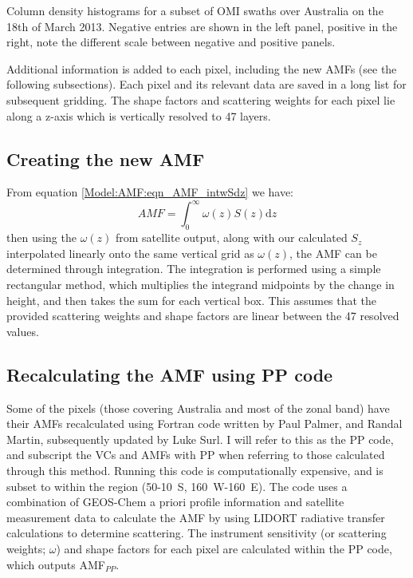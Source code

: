     {
      Column density histograms for a subset of OMI swaths over Australia on the 18th of March 2013.
      Negative entries are shown in the left panel, positive in the right, note the different scale between negative and positive panels.}
    {\label{Model:omiRecalc:fig_OMI_negative_hist}}
  
    Additional information is added to each pixel, including the new AMFs (see the following subsections).
    Each pixel and its relevant data are saved in a long list for subsequent gridding.
    The shape factors and scattering weights for each pixel lie along a z-axis which is vertically resolved to 47 layers.
  
  \subsection{Creating the new AMF}
    \label{Model:omiRecalc:AMFgc}
    
    From equation \ref{Model:AMF:eqn_AMF_intwSdz} we have:
    $$ AMF = \int_0^\infty \omega(z) S(z) \mathrm{d}z $$
    then using the $\omega(z)$ from satellite output, along with our calculated $S_z$ interpolated linearly onto the same vertical grid as $\omega(z)$, the AMF can be determined through integration.
    The integration is performed using a simple rectangular method, which multiplies the integrand midpoints by the change in height, and then takes the sum for each vertical box.
    This assumes that the provided scattering weights and shape factors are linear between the 47 resolved values.
    
  \subsection{Recalculating the AMF using PP code}
    \label{Model:omiRecalc:ppcode}
    
    Some of the pixels (those covering Australia and most of the zonal band) have their AMFs recalculated using Fortran code written by Paul Palmer, and Randal Martin, subsequently updated by Luke Surl.
    I will refer to this as the PP code, and subscript the VCs and AMFs with PP when referring to those calculated through this method.
    Running this code is computationally expensive, and is subset to within the region (50-10\degr~S, 160\degr~W-160\degr~E).
    The code uses a combination of GEOS-Chem a priori profile information and satellite measurement data to calculate the AMF by using LIDORT radiative transfer calculations to determine scattering.
    The instrument sensitivity (or scattering weights; $\omega$) and shape factors for each pixel are calculated within the PP code, which outputs AMF$_{PP}$.
    
